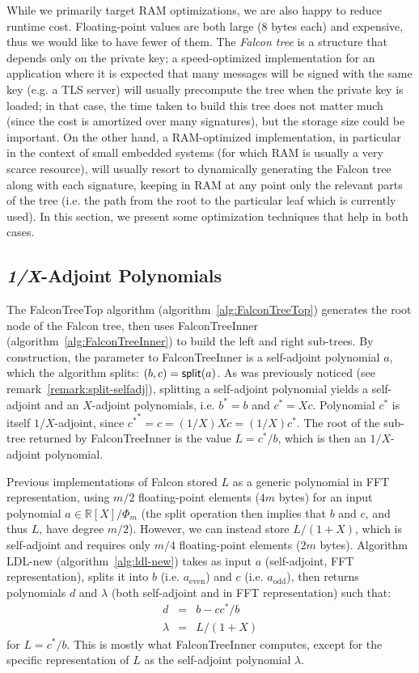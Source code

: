 \documentclass{llncs}
\newcommand{\bR}{\mathbb{R}}
\newcommand{\adj}[1]{{#1}^*}
\begin{document}
While we primarily target RAM optimizations, we are also happy to reduce
runtime cost. Floating-point values are both large (8 bytes each) and
expensive, thus we would like to have fewer of them. The \emph{Falcon
tree} is a structure that depends only on the private key; a
speed-optimized implementation for an application where it is expected
that many messages will be signed with the same key (e.g. a TLS server)
will usually precompute the tree when the private key is loaded; in that
case, the time taken to build this tree does not matter much (since the
cost is amortized over many signatures), but the storage size could be
important. On the other hand, a RAM-optimized implementation, in
particular in the context of small embedded systems (for which RAM is
usually a very scarce resource), will usually resort to dynamically
generating the Falcon tree along with each signature, keeping in RAM at
any point only the relevant parts of the tree (i.e. the path from the
root to the particular leaf which is currently used). In this section,
we present some optimization techniques that help in both cases.

\subsection{\emph{1/X}-Adjoint Polynomials}

The \textsf{FalconTreeTop} algorithm (algorithm~\ref{alg:FalconTreeTop})
generates the root node of the Falcon tree, then uses
\textsf{FalconTreeInner} (algorithm~\ref{alg:FalconTreeInner}) to build
the left and right sub-trees. By construction, the parameter to
\textsf{FalconTreeInner} is a self-adjoint polynomial $a$, which the
algorithm splits: $(b, c) = \text{\textsf{split}}(a)$. As was previously
noticed (see remark~\ref{remark:split-selfadj}), splitting a
self-adjoint polynomial yields a self-adjoint and an $X$-adjoint
polynomials, i.e. $\adj{b} = b$ and $\adj{c} = Xc$. Polynomial $\adj{c}$
is itself $1/X$-adjoint, since $\adj{\adj{c}} = c = (1/X)Xc =
(1/X)\adj{c}$. The root of the sub-tree returned by
\textsf{FalconTreeInner} is the value $L = \adj{c}/b$, which is then an
$1/X$-adjoint polynomial.

Previous implementations of Falcon stored $L$ as a generic polynomial in
FFT representation, using $m/2$ floating-point elements ($4m$ bytes) for
an input polynomial $a \in \bR[X]/\Phi_m$ (the \textsf{split} operation
then implies that $b$ and $c$, and thus $L$, have degree $m/2$).
However, we can instead store $L/(1 + X)$, which is self-adjoint and
requires only $m/4$ floating-point elements ($2m$ bytes). Algorithm
\textsf{LDL-new} (algorithm~\ref{alg:ldl-new}) takes as input $a$
(self-adjoint, FFT representation), splits it into $b$ (i.e.
$a_{\text{even}}$) and $c$ (i.e. $a_{\text{odd}}$), then returns
polynomials $d$ and $\lambda$ (both self-adjoint and in FFT
representation) such that:
\begin{eqnarray*}
    d &=& b - c\adj{c}/b \\
    \lambda &=& L/(1+X)
\end{eqnarray*}
for $L = \adj{c}/b$. This is mostly what \textsf{FalconTreeInner}
computes, except for the specific representation of $L$ as the
self-adjoint polynomial $\lambda$.
\end{document}
